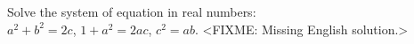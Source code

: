 \problem{}
Solve the system of equation in real numbers:\\
$a^2 + b^2 = 2 c$,\quad
$1 + a^2 = 2 a c$,\quad
$c^2 = a b$.
\solution
<FIXME: Missing English solution.>
\endproblem
